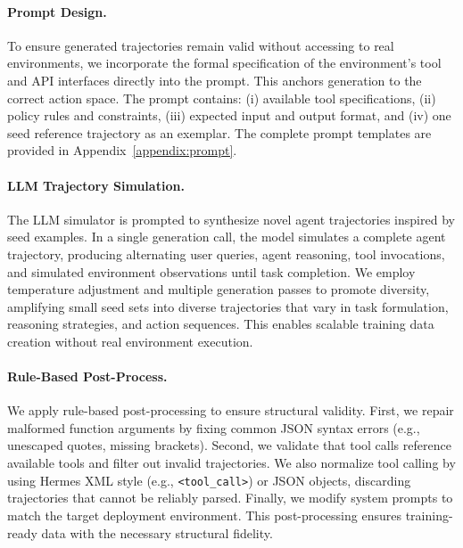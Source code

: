 \paragraph{Prompt Design.}
To ensure generated trajectories remain valid without accessing to real environments, we incorporate the formal specification of the environment's tool and API interfaces directly into the prompt. This anchors generation to the correct action space. The prompt contains: (i) available tool specifications, (ii) policy rules and constraints, (iii) expected input and output format, and (iv) one seed reference trajectory as an exemplar. 
The complete prompt templates are provided in Appendix~\ref{appendix:prompt}.


\paragraph{LLM Trajectory Simulation.}
The LLM simulator is prompted to synthesize novel agent trajectories inspired by seed examples. In a single generation call, the model simulates a complete agent trajectory, producing alternating user queries, agent reasoning, tool invocations, and simulated environment observations until task completion.
We employ temperature adjustment and multiple generation passes to promote diversity, amplifying small seed sets into diverse trajectories that vary in task formulation, reasoning strategies, and action sequences. This enables scalable training data creation without real environment execution.

\paragraph{Rule-Based Post-Process.}
We apply rule-based post-processing to ensure structural validity. First, we repair malformed function arguments by fixing common JSON syntax errors (e.g., unescaped quotes, missing brackets). Second, we validate that tool calls reference available tools and filter out invalid trajectories. We also normalize tool calling by using Hermes XML style (e.g., \texttt{<tool\_call>}) or JSON objects, discarding trajectories that cannot be reliably parsed. Finally, we modify system prompts to match the target deployment environment. This post-processing ensures training-ready data with the necessary structural fidelity.




